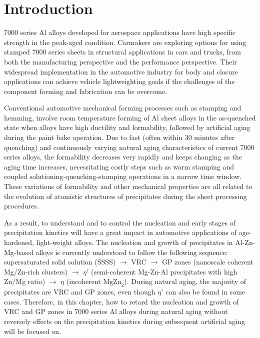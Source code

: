 \section{Introduction}
\label{Chap:Al/Vac:section:Intro}

7000 series Al alloys developed for aerospace applications have high specific strength in the peak-aged condition. Carmakers are exploring options for using stamped 7000 series sheets in structural applications in cars and trucks, from both the manufacturing perspective and the performance perspective. Their widespread implementation in the automotive industry for body and closure applications can achieve vehicle lightweighting goals if the challenges of the component forming and fabrication can be overcome. \cite{fridlyander2002aluminum,hirsch2011aluminium,hirsch2014recent}

Conventional automotive mechanical forming processes such as stamping and hemming, involve room temperature forming of Al sheet alloys in the as-quenched state when alloys have high ductility and formability, followed by artificial aging during the paint bake operation. Due to fast (often within 30 minutes after quenching) and continuously varying natural aging characteristics of current 7000 series alloys, the formability decreases very rapidly and keeps changing as the aging time increases, necessitating costly steps such as warm stamping and coupled solutioning-quenching-stamping operations in a narrow time window. \cite{bryant1999effects,li2004biaxial} These variations of formability and other mechanical properties are all related to the evolution of atomistic structures of precipitates during the sheet processing procedures.

As a result, to understand and to control the nucleation and early stages of precipitation kinetics will have a great impact in automotive applications of age-hardened, light-weight alloys. \cite{deschamps1998influence,banhart2011kinetics,liang2012kinetics,deschamps2014precipitation} The nucleation and growth of precipitates in Al-Zn-Mg-based alloys is currently understood to follow the following sequence: supersaturated solid solution (SSSS) $\rightarrow$ \acf{VRC} $\rightarrow$ \acf{GP} zones (nanoscale coherent Mg/Zn-rich clusters) $\rightarrow$ $\eta'$ (semi-coherent Mg-Zn-Al precipitates with high Zn/Mg ratio) $\rightarrow$ $\eta$ (incoherent $\text{MgZn}_\text{2}$). \cite{ragueneau2000review,deschamps2014precipitation,berg2001gp,chung2018transmission} During natural aging, the majority of precipitates are \ac{VRC} and \ac{GP} zones, even though $\eta'$ can also be found in some cases. \cite{mukhopadhyay1994guinier} Therefore, in this chapter, how to retard the nucleation and growth of \ac{VRC} and \ac{GP} zones in 7000 series Al alloys during natural aging without reversely effects on the precipitation kinetics during subsequent artificial aging will be focused on.